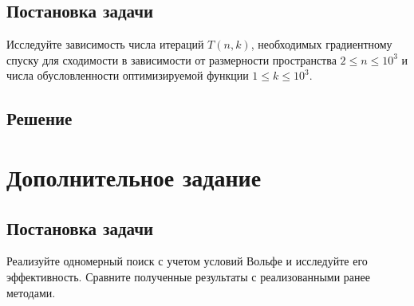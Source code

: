 \documentclass[12pt, a4paper, oneside]{article}
\begin{document}
	\subsection*{Постановка задачи}
	Исследуйте зависимость числа итераций $T(n, k)$, необходимых градиентному спуску для сходимости в зависимости от размерности пространства $2 \leqslant n \leqslant 10^{3}$ и числа обусловленности оптимизируемой функции $1 \leqslant k \leqslant 10^{3}$.
	\subsection*{Решение}
	\section*{Дополнительное задание}
	\subsection*{Постановка задачи}
	Реализуйте одномерный поиск с учетом условий Вольфе и исследуйте его эффективность. Сравните полученные результаты с реализованными ранее методами.
\end{document}

